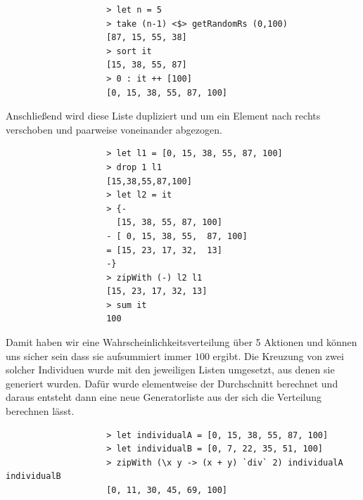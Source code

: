             \begin{mdframed}
            \begin{verbatim}
                    > let n = 5
                    > take (n-1) <$> getRandomRs (0,100)
                    [87, 15, 55, 38]
                    > sort it
                    [15, 38, 55, 87]
                    > 0 : it ++ [100]
                    [0, 15, 38, 55, 87, 100]
            \end{verbatim}
            \end{mdframed}
            \noindent
            Anschließend wird diese Liste dupliziert und um ein Element nach rechts verschoben und paarweise voneinander abgezogen.
            \begin{mdframed}
            \begin{verbatim}
                    > let l1 = [0, 15, 38, 55, 87, 100]
                    > drop 1 l1
                    [15,38,55,87,100]
                    > let l2 = it
                    > {-
                      [15, 38, 55, 87, 100]
                    - [ 0, 15, 38, 55,  87, 100]
                    = [15, 23, 17, 32,  13]
                    -}
                    > zipWith (-) l2 l1
                    [15, 23, 17, 32, 13]
                    > sum it
                    100
            \end{verbatim}
            \end{mdframed}
            \noindent
            Damit haben wir eine Wahrscheinlichkeitsverteilung über 5 Aktionen und können uns sicher sein dass sie aufsummiert immer $100$ ergibt. Die Kreuzung von zwei solcher Individuen wurde mit den jeweiligen Listen umgesetzt, aus denen sie generiert wurden. Dafür wurde elementweise der Durchschnitt berechnet und daraus entsteht dann eine neue Generatorliste aus der sich die Verteilung berechnen lässt.
            \begin{mdframed}
            \begin{verbatim}
                    > let individualA = [0, 15, 38, 55, 87, 100]
                    > let individualB = [0, 7, 22, 35, 51, 100]
                    > zipWith (\x y -> (x + y) `div` 2) individualA individualB
                    [0, 11, 30, 45, 69, 100]
            \end{verbatim}
            \end{mdframed}
